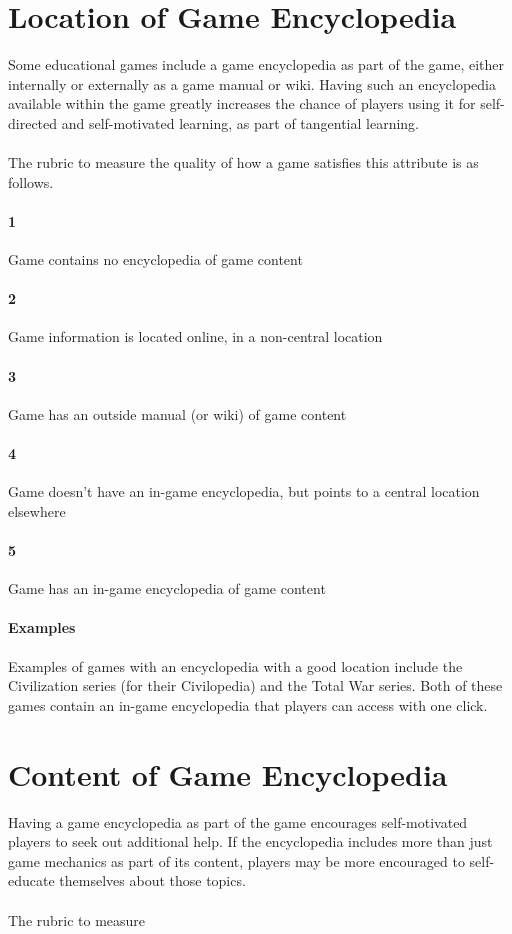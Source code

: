 \section{Location of Game Encyclopedia}{Some educational games include a game encyclopedia as part of the game, either internally or externally as a game manual or wiki. Having such an encyclopedia available within the game greatly increases the chance of players using it for self-directed and self-motivated learning, as part of tangential learning.}\paragraph{}The rubric to measure the quality of how a game satisfies this attribute is as follows.\paragraph{1}{Game contains no encyclopedia of game content}\paragraph{2}{Game information is located online, in a non-central location}\paragraph{3}{Game has an outside manual (or wiki) of game content}\paragraph{4}{Game doesn't have an in-game encyclopedia, but points to a central location elsewhere}\paragraph{5}{Game has an in-game encyclopedia of game content}\paragraph{Examples}Examples of games with an encyclopedia with a good location include the Civilization series (for their Civilopedia) and the Total War series. Both of these games contain an in-game encyclopedia that players can access with one click. \section{Content of Game Encyclopedia}{Having a game encyclopedia as part of the game encourages self-motivated players to seek out additional help. If the encyclopedia includes more than just game mechanics as part of its content, players may be more encouraged to self-educate themselves about those topics.}\paragraph{}The rubric to measure 